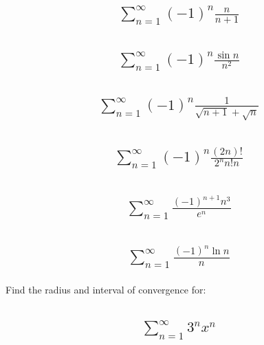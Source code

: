 \documentclass{article}
\begin{document}
\subsection{
	\begin{align*}
		\sum_{n = 1}^{\infty} (-1)^n \frac{n}{n + 1}
	\end{align*}
}

\subsection{
	\begin{align*}
		\sum_{n = 1}^{\infty} (-1)^n \frac{\sin{n}}{n^2}
	\end{align*}
}

\subsection{
	\begin{align*}
		\sum_{n = 1}^{\infty} (-1)^n \frac{1}{\sqrt{n +1} + \sqrt{n}}
	\end{align*}
}

\subsection{
	\begin{align*}
		\sum_{n = 1}^{\infty} (-1)^n \frac{(2n)!}{2^n n! n}
	\end{align*}
}

\subsection{
	\begin{align*}
		\sum_{n = 1}^{\infty} \frac{(-1)^{n + 1} n^3}{e^n}
	\end{align*}
}

\subsection{
	\begin{align*}
		\sum_{n = 1}^{\infty} \frac{(-1)^{n} \ln{n}}{n}
	\end{align*}
}

Find the radius and interval of convergence for:
\subsection{
	\begin{align*}
		\sum_{n = 1}^{\infty} 3^n x^n
	\end{align*}
}
\end{document}
